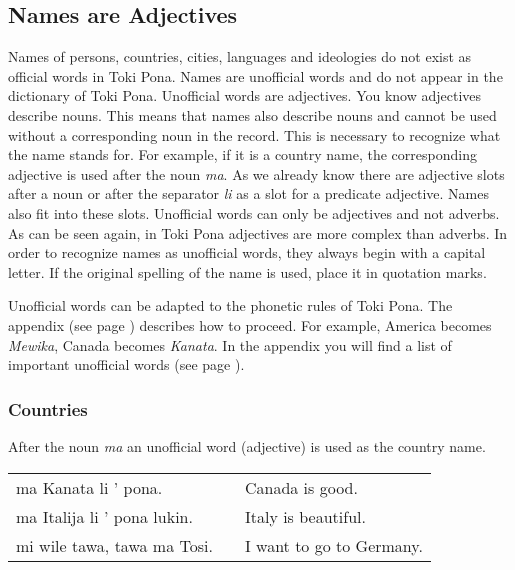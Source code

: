 \subsection*{Names are Adjectives}
\label{'unofficial_words_intro'}
%
%
Names of persons, countries, cities, languages and ideologies do not exist as official words in Toki Pona.
Names are unofficial words and do not appear in the dictionary of Toki Pona.
Unofficial words are adjectives.
You know adjectives describe nouns.
This means that names also describe nouns and cannot be used without a corresponding noun in the record.
This is necessary to recognize what the name stands for.
For example, if it is a country name, the corresponding adjective is used after the noun \textit{ma}.
As we already know there are adjective slots after a noun or after the separator \textit{li} as a slot for a predicate adjective.
Names also fit into these slots.
Unofficial words can only be adjectives and not adverbs.
As can be seen again, in Toki Pona adjectives are more complex than adverbs.
In order to recognize names as unofficial words, they always begin with a capital letter.
If the original spelling of the name is used, place it in quotation marks.

Unofficial words can be adapted to the phonetic rules of Toki Pona.
The appendix (see page \pageref{'phonet_trans'}) describes how to proceed.
For example, America becomes \textit{Mewika}, Canada becomes \textit{Kanata}.
In the appendix you will find a list of important unofficial words (see page \pageref{'unofficial_words'}).
%
\subsubsection*{Countries}
%
After the noun \textit{ma} an unofficial word (adjective) is used as the country name.

\begin{supertabular}{p{5,5cm}|ll}
    ma Kanata li ' pona.        &  & Canada is good.          \\
    ma Italija li ' pona lukin. &  & Italy is beautiful.      \\
    mi wile tawa, tawa ma Tosi. &  & I want to go to Germany. \\
\end{supertabular}

